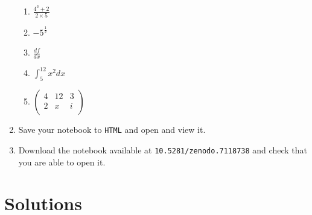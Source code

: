 \begin{enumerate}
\begin{enumerate}
\item 

\(\frac{4 ^ 3 + 2}{2\times 5}\)

\item 

\(- 5 ^ {\frac{1}{2}}\)

\item 

\(\frac{df}{dx}\)

\item 

\(\int_{5}^{12}x^2dx\)

\item 

\(\begin{pmatrix}4 & 12 & 3\\2 & x & i\\\end{pmatrix}\)

\end{enumerate}

\item 

Save your notebook to \texttt{HTML} and open and view it.

\item 

Download the notebook available at
\texttt{10.5281/zenodo.7118738} and
check that you are able to open it.

\end{enumerate}




\section{Solutions}

\label{\detokenize{tools-for-mathematics/01-using-notebooks/solutions/main:question-1}}

